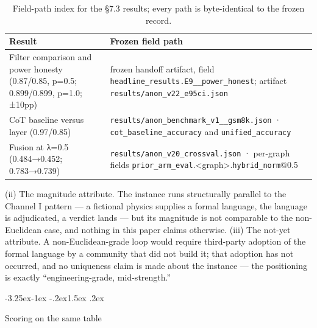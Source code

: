 \documentclass[11pt,a4paper]{article}
\makeatletter
\renewcommand\subsection{\@startsection{subsection}{2}{\z@}%
  {-3.25ex\@plus -1ex \@minus -.2ex}{1.5ex \@plus .2ex}%
  {\normalfont\large\bfseries\raggedright}}
\makeatother
\begin{document}
\begin{table}[htbp]
\centering
\small
\setlength{\tabcolsep}{4pt}
\renewcommand{\arraystretch}{1.15}
\begin{tabularx}{0.985\textwidth}{@{}>{\raggedright\arraybackslash}p{}>{\raggedright\arraybackslash}X@{}}
\toprule
\textbf{Result} & \textbf{Frozen field path} \\
\midrule
Filter comparison and power honesty (0.87/0.85, p=0.5; 0.899/0.899, p=1.0; ±10pp) & frozen handoff artifact, field \texttt{headline\_\allowbreak results.E9\_\allowbreak 5\_\allowbreak power\_\allowbreak honest}; artifact \texttt{results/\allowbreak anon\_\allowbreak v22\_\allowbreak e95ci.json} \\
CoT baseline versus layer (0.97/0.85) & \texttt{results/\allowbreak anon\_\allowbreak benchmark\_\allowbreak v1\_\allowbreak 4\_\allowbreak gsm8k.json} · \texttt{cot\_\allowbreak baseline\_\allowbreak accuracy} and \texttt{unified\_\allowbreak accuracy} \\
Fusion at λ=0.5 (0.484→0.452; 0.783→0.739) & \texttt{results/\allowbreak anon\_\allowbreak v20\_\allowbreak crossval.json} · per-graph fields \texttt{prior\_\allowbreak arm\_\allowbreak eval}.<graph>.\texttt{hybrid\_\allowbreak norm}@0.5 \\
\bottomrule
\end{tabularx}
\caption{Field-path index for the §7.3 results; every path is byte-identical to the frozen record.}
\label{tab:fieldpathsS}
\end{table}

(ii) The magnitude attribute. The instance runs structurally parallel to the Channel I pattern — a fictional physics supplies a formal language, the language is adjudicated, a verdict lands — but its magnitude is not comparable to the non-Euclidean case, and nothing in this paper claims otherwise. (iii) The not-yet attribute. A non-Euclidean-grade loop would require third-party adoption of the formal language by a community that did not build it; that adoption has not occurred, and no uniqueness claim is made about the instance — the positioning is exactly ``engineering-grade, mid-strength.''

\subsection{Scoring on the same table}
\end{document}

